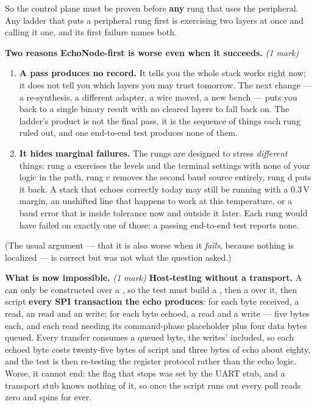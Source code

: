 So the control plane must be proven before \textbf{any} rung that uses the peripheral. Any ladder
that puts a peripheral rung first is exercising two layers at once and calling it one, and its first
failure names both.

\textbf{Two reasons EchoNode-first is worse even when it succeeds.} \textit{(1 mark)}
\begin{enumerate}
  \item \textbf{A pass produces no record.} It tells you the whole stack works right now; it does not
    tell you which layers you may trust tomorrow. The next change --- a re-synthesis, a different
    adapter, a wire moved, a new bench --- puts you back to a single binary result with no cleared
    layers to fall back on. The ladder's product is not the final pass, it is the sequence of things
    each rung ruled out, and one end-to-end test produces none of them.
  \item \textbf{It hides marginal failures.} The rungs are designed to stress \emph{different}
    things: rung a exercises the levels and the terminal settings with none of your logic in the
    path, rung c removes the second baud source entirely, rung d puts it back. A stack that echoes
    correctly today may still be running with a 0.3\,V  margin, an unshifted line that
    happens to work at this temperature, or a baud error that is inside tolerance now and outside it
    later. Each rung would have failed on exactly one of those; a passing end-to-end test reports
    none.
\end{enumerate}
(The usual argument --- that it is also worse when it \emph{fails}, because nothing is localized ---
is correct but was not what the question asked.)

\textbf{What is now impossible.} \textit{(1 mark)} \textbf{Host-testing  without a
transport.} A  can only be constructed over a , so
the test must build a , then a  over it, then script
\textbf{every SPI transaction the echo produces}: for each byte received, a  read, an
 read and an  write; for each byte echoed, a  read and a
 write --- five bytes each, and each read needing its command-phase placeholder plus
four data bytes queued. Every transfer consumes a queued byte, the writes' included, so each echoed
byte costs twenty-five bytes of script and three bytes of echo about eighty, and the test is then
re-testing the register protocol rather than the echo logic. Worse, it cannot end: the flag that
stops  was set by the UART stub, and a transport stub knows nothing of it, so once the
script runs out every  poll reads zero and  spins for ever.

